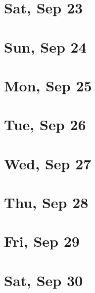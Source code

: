 	\section{Sat, Sep 23}
		
	\section{Sun, Sep 24}
		
	\section{Mon, Sep 25}
		
	\section{Tue, Sep 26}
		
	\section{Wed, Sep 27}
		
	\section{Thu, Sep 28}
		
	\section{Fri, Sep 29}
		
	\section{Sat, Sep 30}
		
